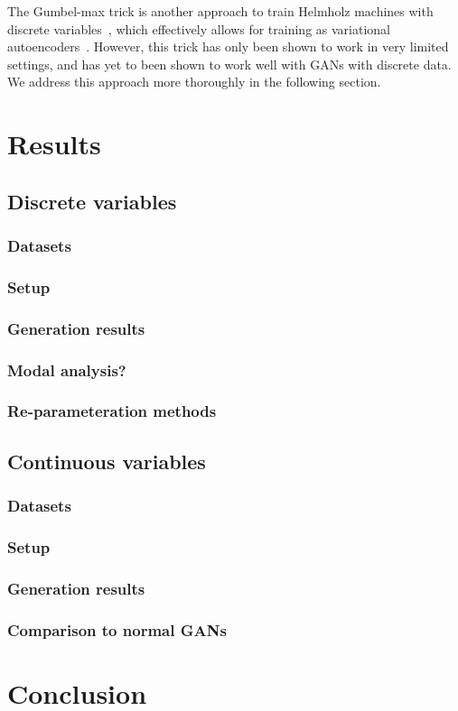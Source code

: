 \documentclass[10pt]{article}
\begin{document}
The Gumbel-max trick is another approach to train Helmholz machines with discrete variables~\citep{jang2016categorical}, which effectively allows for training as variational autoencoders~\citep[VAEs,][]{kingma2013auto}.
However, this trick has only been shown to work in very limited settings, and has yet to been shown to work well with GANs with discrete data.
We address this approach more thoroughly in the following section.

\section{Results}
\subsection{Discrete variables}
\subsubsection{Datasets}
\subsubsection{Setup}
\subsubsection{Generation results}
\subsubsection{Modal analysis?}
\subsubsection{Re-parameteration methods}

\subsection{Continuous variables}
\subsubsection{Datasets}
\subsubsection{Setup}
\subsubsection{Generation results}
\subsubsection{Comparison to normal GANs}

\section{Conclusion}

\small


\end{document}
